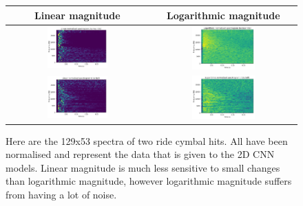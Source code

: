 \documentclass[12pt]{article}
\begin{document}
    \begin{figure}[H]
        \centering
        \begin{tabular}{c|c}
            Linear magnitude & Logarithmic magnitude \\
            \hline
            \includegraphics[width=0.45\textwidth]{figures/linear_spectrogram_ride_normal.png}&
            \includegraphics[width=0.45\textwidth]{figures/log_spectrogram_ride_normal.png}\\
            \includegraphics[width=0.45\textwidth]{figures/linear_spectrogram_ride_bell.png}&
            \includegraphics[width=0.45\textwidth]{figures/log_spectrogram_ride_bell.png}
        \end{tabular}
    \caption{\footnotesize{Here are the 129x53 spectra of two ride cymbal hits. All have been normalised and represent the data that is given to the 2D CNN models. Linear magnitude is much less sensitive to small changes than logarithmic magnitude, however logarithmic magnitude suffers from having a lot of noise.}}
    \label{fig:spectrograms}
    \end{figure}
    
\end{document}
